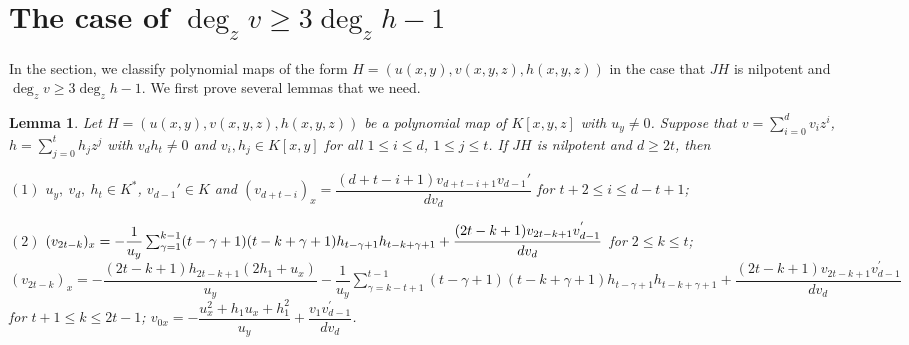 \documentclass[12pt, twoside, leqno]{article}
\newtheorem{lem}[thm]{Lemma}
\theoremstyle{definition}
\numberwithin{equation}{section}
\begin{document}
\section{The case of $\deg_zv\geq 3\deg_zh-1$}

In the section, we classify polynomial maps of the form
$H=(u(x,y),v(x,y,z),\allowbreak h(x,y,z))$ in the case that $JH$ is
nilpotent and $\deg_zv\geq 3\deg_zh-1$. We first prove several lemmas that we need.

\begin{lem} \label{lem2.1}
Let $H=(u(x,y),v(x,y,z),h(x,y,z))$ be a polynomial map of $K[x,y,z]$ with $u_y\neq 0$.
Suppose that $v=\sum_{i=0}^dv_iz^i$, $h=\sum_{j=0}^th_jz^j$ with $v_dh_t\neq 0$ and $v_i, h_j\in K[x,y]$ for all $1\leq i\leq d$, $1\leq j\leq t$. If $JH$ is nilpotent and $d\geq 2t$, then

$(1)$ $u_y,~v_d,~h_t\in K^*$, $v_{d-1}'\in K$ and $(v_{d+t-i})_x=\dfrac{(d+t-i+1)v_{d+t-i+1}v_{d-1}'}{dv_d}$ for $t+2\leq i\leq d-t+1$;

$(2)$ $(v_{2t-k})_x=-\dfrac{1}{u_{y}}\sum_{\gamma=1}^{k-1}(t-\gamma+1)(t-k+\gamma+1)h_{t-\gamma+1}h_{t-k+\gamma+1}+\\ \dfrac{(2t-k+1)v_{2t-k+1}v_{d-1}^{'}}{dv_{d}}$ for $2\leq k\leq t$; $(v_{2t-k})_x=-\dfrac{(2t-k+1)h_{2t-k+1}(2h_{1}+u_{x})}{u_{y}}-\dfrac{1}{u_{y}}\sum_{\gamma=k-t+1}^{t-1}(t-\gamma+1)(t-k+\gamma+1)h_{t-\gamma+1}h_{t-k+\gamma+1}+\dfrac{(2t-k+1)v_{2t-k+1}v_{d-1}^{'}}{dv_{d}}$
 for $t+1\leq k\leq 2t-1$; $v_{0x}=-\dfrac{u_{x}^{2}+h_{1}u_{x}+h_{1}^{2}}{u_{y}}+\dfrac{v_{1}v_{d-1}^{'}}{dv_{d}}$.
\end{lem}
\end{document}
